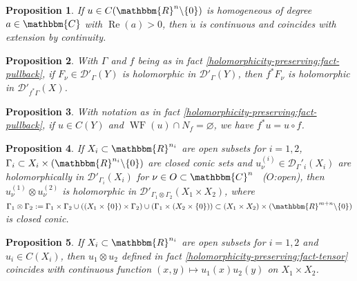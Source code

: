 \documentclass{article}
\newcommand{\assign}{:=}
\newcommand{\tmop}[1]{\ensuremath{\operatorname{#1}}}
\numberwithin{definition}{section}
\numberwithin{lemma}{section}
\newtheorem{proposition}{Proposition}
\numberwithin{proposition}{section}
{\theorembodyfont{\rmfamily}\newtheorem{remark}{Remark}
\numberwithin{remark}{section}
}
\begin{document}
\begin{proposition}
  \label{holomorphicity-preserving:prop-homog-cts}If $u \in C ( \mathbbm{R}^n
  \backslash \{ 0 \})$ is homogeneous of degree $a \in \mathbbm{C}$ with
  $\tmop{Re} ( a) > 0$, then $\dot{u}$ is continuous and coincides with
  extension by continuity.
\end{proposition}

\begin{proposition}
  \label{holomorphicity-preserving:prop-pullback-holo}With $\Gamma$ and $f$
  being as in fact \ref{holomorphicity-preserving:fact-pullback}, if $F_{\nu}
  \in \mathcal{D}'_{\Gamma} ( Y)$ is holomorphic in $\mathcal{D}'_{\Gamma} (
  Y)$, then $f^{\ast} F_{\nu}$ is holomorphic in $\mathcal{D}'_{f^{\ast}
  \Gamma} ( X)$.
\end{proposition}

\begin{proposition}
  \label{holomorphicity-preserving:prop-pullback-cts}With notation as in fact
  \ref{holomorphicity-preserving:fact-pullback}, if $u \in C ( Y)$ and
  $\tmop{WF} ( u) \cap N_f = \varnothing$, we have $f^{\ast} u = u \circ f$.
\end{proposition}

\begin{proposition}
  \label{holomorphicity-preserving:prop-tensor-holo}If $X_i \subset
  \mathbbm{R}^{n_i}$ are open subsets for $i = 1, 2$, $\Gamma_i \subset X_i
  \times ( \mathbbm{R}^{n_i} \backslash \{ 0 \})$ are closed conic sets and
  $u^{( i)}_{\nu} \in \mathcal{D}_{\Gamma}\prime_i ( X_i)$ are holomorphically in
  $\mathcal{D}'_{\Gamma_i} ( X_i)$ for $\nu \in O \subset \mathbbm{C}^n$ \
  ($O$:open), then $u_{\nu}^{( 1)} \otimes u^{( 2)}_{\nu}$ is holomorphic in
  $\mathcal{D}'_{\Gamma_1 \otimes \Gamma_2} ( X_1 \times X_2)$, where
  $\Gamma_1 \otimes \Gamma_2 \assign \Gamma_1 \times \Gamma_2 \cup ( ( X_1
  \times \{ 0 \}) \times \Gamma_2) \cup ( \Gamma_1 \times ( X_2 \times \{ 0
  \})) \subset ( X_1 \times X_2) \times ( \mathbbm{R}^{m + n} \backslash \{ 0
  \})$ is closed conic.
\end{proposition}

\begin{proposition}
  \label{holomorphicity-preserving:prop-tensor-cts}If $X_i \subset
  \mathbbm{R}^{n_i}$ are open subsets for $i = 1, 2$ and $u_i \in C ( X_i)$,
  then $u_1 \otimes u_2$ defined in fact
  \ref{holomorphicity-preserving:fact-tensor} coincides with continuous
  function $( x, y) \mapsto u_1 ( x) u_2 ( y)$ on $X_1 \times X_2$.
\end{proposition}
\end{document}
